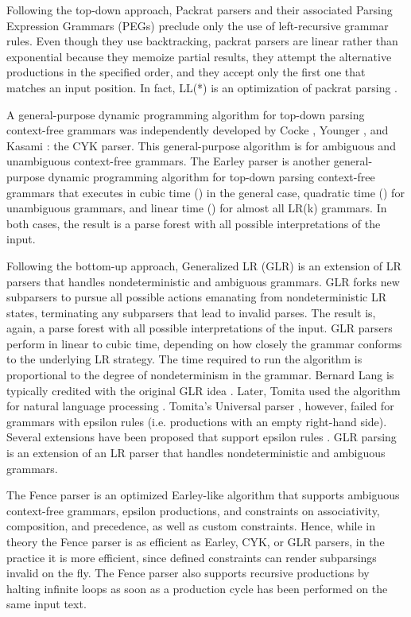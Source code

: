 \documentclass[preprint]{elsarticle}
\begin{document}
Following the top-down approach, Packrat parsers \cite{Ford2002packrat} and their associated Parsing Expression Grammars (PEGs) \cite{Ford2004peg} preclude only the use of left-recursive grammar rules.
Even though they use backtracking, packrat parsers are linear rather than exponential because they memoize partial results, they attempt the alternative productions in the specified order, and they accept only the first one that matches an input position.
In fact, LL(*) is an optimization of packrat parsing \cite{Parr2011}.

A general-purpose dynamic programming algorithm for top-down parsing context-free grammars was independently developed by Cocke \cite{Cocke1970}, Younger \cite{Younger1967}, and Kasami \cite{Kasami1965}: the CYK parser.
This general-purpose algorithm is  for ambiguous and unambiguous context-free grammars.
The Earley parser \cite{Earley1970} is another general-purpose dynamic programming algorithm for top-down parsing context-free grammars that executes in cubic time () in the general case, quadratic time () for unambiguous grammars, and linear time () for almost all LR(k) grammars.
In both cases, the result is a parse forest with all possible interpretations of the input.

Following the bottom-up approach, Generalized LR (GLR) is an extension of LR parsers that handles nondeterministic and ambiguous grammars.
GLR forks new subparsers to pursue all possible actions emanating from nondeterministic LR states, terminating any subparsers that lead to invalid parses.
The result is, again, a parse forest with all possible interpretations of the input.
GLR parsers perform in linear to cubic time, depending on how closely the grammar conforms to the underlying LR strategy.
The time required to run the algorithm is proportional to the degree of nondeterminism in the grammar.
Bernard Lang is typically credited with the original GLR idea \cite{Lang1974}.
Later, Tomita used the algorithm for natural language processing \cite{Tomita1985}.
Tomita's Universal parser \cite{Tomita1987}, however, failed for grammars with epsilon rules (i.e. productions with an empty right-hand side).
Several extensions have been proposed that support epsilon rules \cite{Farshi1991,Rekers1992,Ishii1994,McPeak2004}.
GLR parsing is an extension of an LR parser that handles nondeterministic and ambiguous grammars.

The Fence parser \cite{Quesada2012f} is an optimized Earley-like algorithm that supports ambiguous context-free grammars, epsilon productions, and constraints on associativity, composition, and precedence, as well as custom constraints.
Hence, while in theory the Fence parser is as efficient as Earley, CYK, or GLR parsers, in the practice it is more efficient, since defined constraints can render subparsings invalid on the fly.
The Fence parser also supports recursive productions by halting infinite loops as soon as a production cycle has been performed on the same input text.
\end{document}
